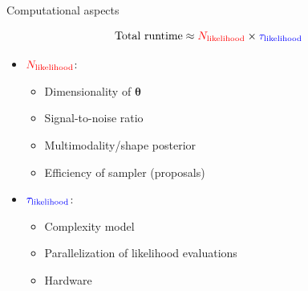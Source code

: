 \documentclass[usenames,dvipsnames,t]{beamer}
\newcommand{\boldtheta}{\boldsymbol{\theta}}
\begin{document}
\begin{frame}{Computational aspects}

  \def\x{3mm}
  \def\y{1mm}

  \begin{equation*}
    {\rm{Total \ runtime}} \approx \textcolor{red}{N_{{\rm{likelihood}}}} \times \textcolor{blue}{\tau_{{\rm{likelihood}}}}
  \end{equation*}

  \pause

  \begin{itemize}
    \item $\textcolor{red}{N_{{\rm{likelihood}}}}$:
    \begin{itemize}
      \item Dimensionality of $\boldtheta$
      
      \vspace{\y}
      
      \item Signal-to-noise ratio
      
      \vspace{\y}
      
      \item Multimodality/shape posterior
      
      \vspace{\y}

      \item Efficiency of sampler (proposals)
    \end{itemize}

    \vspace{\x}
    \pause

    \item $\textcolor{blue}{\tau_{{\rm{likelihood}}}}$:
    \begin{itemize}
      \item Complexity model

      \vspace{\y}

      \item Parallelization of likelihood evaluations

      \vspace{\y}
      
      \item Hardware
    \end{itemize}
  \end{itemize}
\end{frame}
\end{document}
